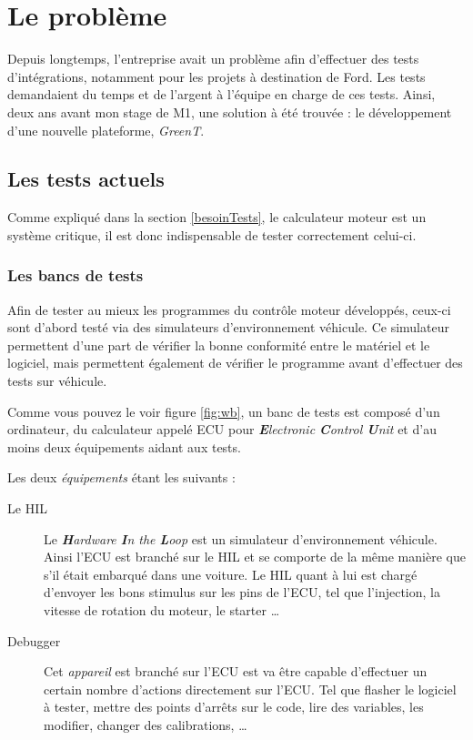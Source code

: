 \chapter{Le problème} \label{chapPb}
\putminitoc
Depuis longtemps, l'entreprise avait un problème afin d'effectuer des tests d'intégrations, notamment pour les projets à destination de Ford. Les tests demandaient du temps et de l'argent à l'équipe en charge de ces tests. Ainsi, deux ans avant mon stage de M1, une solution à été trouvée : le développement d'une nouvelle plateforme, \textit{GreenT}.

\vspace{-32px}
	\section{Les tests actuels} \label{pbTests}
	Comme expliqué dans la section \ref{besoinTests}, le calculateur moteur est un système critique, il est donc indispensable de tester correctement celui-ci.

	\subsection{Les bancs de tests}\label{wb}
	Afin de tester au mieux les programmes du contrôle moteur développés, ceux-ci sont d'abord testé via des simulateurs d'environnement véhicule. Ce simulateur permettent d'une part de vérifier la bonne conformité entre le matériel et le logiciel, mais permettent également de vérifier le programme avant d'effectuer des tests sur véhicule.
		
	Comme vous pouvez le voir figure \ref{fig:wb}, un banc de tests est composé d'un ordinateur, du calculateur appelé ECU pour \textit{\textbf{E}lectronic \textbf{C}ontrol \textbf{U}nit} et d'au moins deux équipements aidant aux tests. 
	
	Les deux \textit{équipements} étant les suivants : 
	\begin{description}
		\item[Le HIL] Le \textit{\textbf{H}ardware \textbf{I}n the \textbf{L}oop} est un simulateur d'environnement véhicule. Ainsi l'ECU est branché sur le HIL et se comporte de la même manière que s'il était embarqué dans une voiture. Le HIL quant à lui est chargé d'envoyer les bons stimulus sur les pins de l'ECU, tel que l'injection, la vitesse de rotation du moteur, le starter \ldots
		\item[Debugger] Cet \textit{appareil} est branché sur l'ECU est va être capable d'effectuer un certain nombre d'actions directement sur l'ECU. Tel que flasher le logiciel à tester, mettre des points d'arrêts sur le code, lire des variables, les modifier, changer des calibrations, \ldots
	\end{description}

